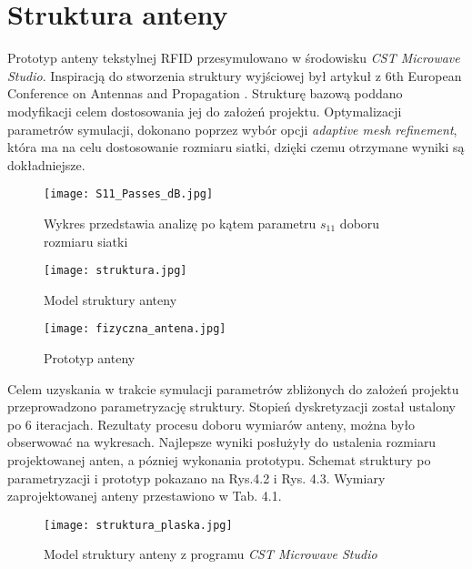 \newpage
\section{Struktura anteny}

Prototyp anteny tekstylnej RFID przesymulowano w środowisku \emph{CST Microwave Studio}. Inspiracją do stworzenia struktury wyjściowej był artykuł z 6th European Conference on Antennas and Propagation \cite{Artykul}. Strukturę bazową poddano modyfikacji celem dostosowania jej do założeń projektu. Optymalizacji parametrów symulacji, dokonano poprzez wybór opcji \emph{adaptive mesh refinement}, która ma na celu dostosowanie rozmiaru siatki, dzięki czemu otrzymane wyniki są dokładniejsze.

\begin{figure}[h!]
\centering
	\texttt{[image: S11\_Passes\_dB.jpg]}
	\caption{Wykres przedstawia analizę po kątem parametru $s_{11}$ doboru rozmiaru siatki}
\end{figure}

\begin{figure}[h!]
	\centering
	    \texttt{[image: struktura.jpg]}
	    \caption{Model struktury anteny}
\end{figure}

\begin{figure}[h!]
	\centering
	    \texttt{[image: fizyczna\_antena.jpg]}
	    \caption{Prototyp anteny}
\end{figure}

\newpage
 Celem uzyskania w trakcie symulacji parametrów zbliżonych do założeń projektu przeprowadzono parametryzację struktury. Stopień dyskretyzacji został ustalony po 6 iteracjach. Rezultaty procesu doboru wymiarów anteny, można było obserwować na wykresach. Najlepsze wyniki posłużyły do ustalenia rozmiaru projektowanej anten, a pózniej wykonania prototypu. Schemat struktury po parametryzacji i prototyp pokazano na Rys.4.2 i Rys. 4.3. Wymiary zaprojektowanej anteny przestawiono w Tab. 4.1. 

\begin{figure}[h!]
	\centering
	    \texttt{[image: struktura\_plaska.jpg]}
	    \caption{Model struktury anteny z programu \emph{CST Microwave Studio}}
\end{figure}

